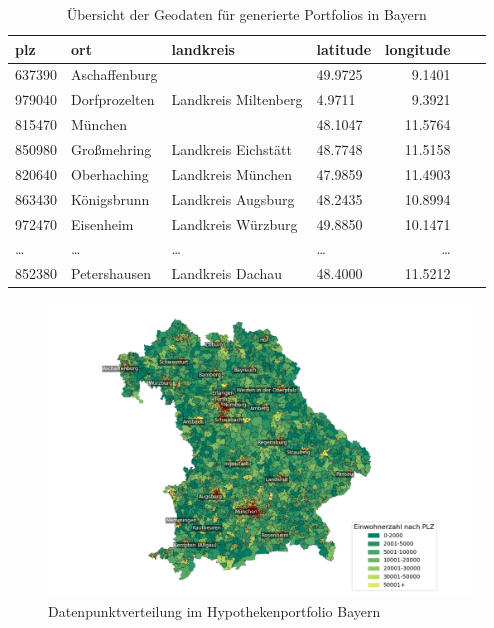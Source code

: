 \begin{table}[htbp]
    \centering
    \small  %
    \caption{Übersicht der Geodaten für generierte Portfolios in Bayern}
    \label{tab:geodatenhyp}
    \begin{tabularx}{\textwidth}{lXlXrXr}
        \toprule
        \textbf{plz} & \textbf{ort} & \textbf{landkreis} & \textbf{latitude} & \textbf{longitude} \\
        \midrule
        637390 & Aschaffenburg & & 49.9725 & 9.1401 \\
        979040 & Dorfprozelten & Landkreis Miltenberg & 4.9711 & 9.3921 \\
        815470 & München & & 48.1047 & 11.5764 \\
        850980 & Großmehring & Landkreis Eichstätt & 48.7748 & 11.5158\\
        820640 & Oberhaching & Landkreis München & 47.9859 & 11.4903 \\
        863430 & Königsbrunn & Landkreis Augsburg & 48.2435 & 10.8994 \\
        972470 & Eisenheim & Landkreis Würzburg & 49.8850 & 10.1471 \\
        \dots & \dots & \dots & \dots & \dots \\
        852380 & Petershausen & Landkreis Dachau & 48.4000 & 11.5212\\
        \bottomrule
    \end{tabularx}
\end{table} 
\FloatBarrier

\begin{figure}[htbp]
    \centering
    \includegraphics[width=\textwidth]{figures/bayern_por_pop.png} 
    \caption{Datenpunktverteilung im Hypothekenportfolio Bayern}
    \label{fig:hypothekenportfolio}
\end{figure}
\FloatBarrier

